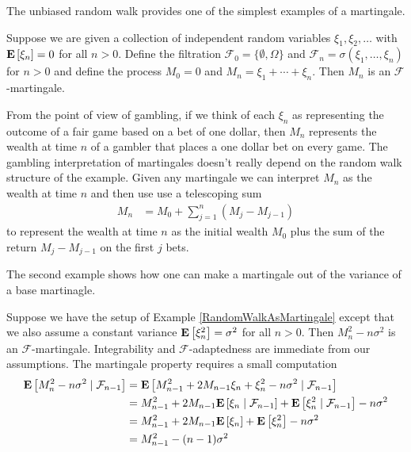 The unbiased random walk provides one of the simplest examples of a martingale.
\begin{examp}\label{RandomWalkAsMartingale}Suppose we are given a collection of independent random
  variables $\xi_1, \xi_2, \dots$ with $\expectation{\xi_n} = 0$ for
  all $n > 0$.  Define the filtration
  $\mathcal{F}_0 = \lbrace \emptyset, \Omega \rbrace$ and
  $\mathcal{F}_n = \sigma(\xi_1, \dots, \xi_n)$ for $n > 0$ and define
  the process $M_0=0$ and $M_n = \xi_1 + \cdots + \xi_n$.  Then $M_n$
  is an $\mathcal{F}$-martingale.
\end{examp}
From the point of view of gambling, if we think of each $\xi_n$ as
representing the outcome of a fair game based on a bet of one dollar,
then $M_n$ represents the wealth at time $n$ of a gambler that places a one dollar
bet on every game.  The gambling interpretation of martingales doesn't
really depend on the random walk structure of the example.  Given any
martingale we can interpret $M_n$ as the wealth at time $n$ and then
use use a telescoping sum
\begin{align*}
M_n &= M_0 + \sum_{j=1}^n (M_j - M_{j-1})
\end{align*}
to represent the wealth at time $n$ as the initial wealth $M_0$ plus
the sum of the return $M_j - M_{j-1}$ on the first $j$ bets.

The second example shows how one can make a martingale out of the
variance of a base martinagle.
\begin{examp}Suppose we have the setup of Example
  \ref{RandomWalkAsMartingale} except that we also assume a constant variance
  $\expectation{\xi_n^2} = \sigma^2$ for all $n > 0$.  Then $M_n^2 - n
  \sigma^2$ is an $\mathcal{F}$-martingale.  Integrability and
  $\mathcal{F}$-adaptedness are immediate from our assumptions.  The
  martingale property requires a small computation
\begin{align*}
\cexpectationlong{\mathcal{F}_{n-1}}{M_n^2 - n \sigma^2} &=
\cexpectationlong{\mathcal{F}_{n-1}}{M_{n-1}^2 + 2 M_{n-1} \xi_n +
  \xi_n^2 - n \sigma^2} \\
&=M_{n-1}^2 +  2 M_{n-1} \cexpectationlong{\mathcal{F}_{n-1}}{\xi_n}
+  \cexpectationlong{\mathcal{F}_{n-1}}{ \xi_n^2} - n \sigma^2 \\
&=M_{n-1}^2 +  2 M_{n-1} \expectation{\xi_n}
+  \expectation{ \xi_n^2} - n \sigma^2 \\
&= M_{n-1}^2 - (n-1)\sigma^2
\end{align*}
\end{examp}

